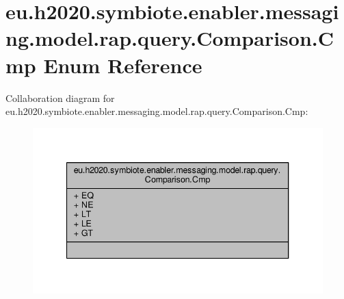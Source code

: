 \hypertarget{enumeu_1_1h2020_1_1symbiote_1_1enabler_1_1messaging_1_1model_1_1rap_1_1query_1_1Comparison_1_1Cmp}{}\section{eu.\+h2020.\+symbiote.\+enabler.\+messaging.\+model.\+rap.\+query.\+Comparison.\+Cmp Enum Reference}
\label{enumeu_1_1h2020_1_1symbiote_1_1enabler_1_1messaging_1_1model_1_1rap_1_1query_1_1Comparison_1_1Cmp}


Collaboration diagram for eu.\+h2020.\+symbiote.\+enabler.\+messaging.\+model.\+rap.\+query.\+Comparison.\+Cmp\+:
\nopagebreak
\begin{figure}[H]
\begin{center}
\leavevmode
\includegraphics[width=340pt]{enumeu_1_1h2020_1_1symbiote_1_1enabler_1_1messaging_1_1model_1_1rap_1_1query_1_1Comparison_1_1Cmp__coll__graph}
\end{center}
\end{figure}
